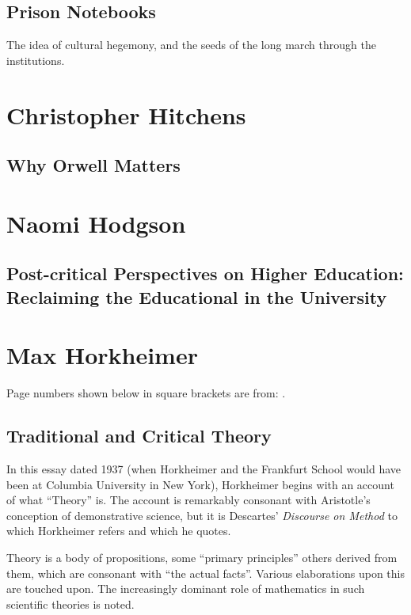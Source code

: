 \documentclass[10pt,titlepage]{book}
\begin{document}
\subsection{Prison Notebooks \cite{gramsci-notes}}

The idea of cultural hegemony, and the seeds of the long march through the institutions.

\section{Christopher Hitchens}\label{HitchensChristopher}

\subsection{Why Orwell Matters\cite{hitchens-wom}}

\section{Naomi Hodgson}\label{HodgsonNaomi}
\subsection{Post-critical Perspectives on Higher Education: Reclaiming the Educational in the University \cite{hodgson2020post}}

\section{Max Horkheimer}\label{HorkheimerMax}

Page numbers shown below in square brackets are from: \cite{horkheimer-crit}.

\subsection{Traditional and Critical Theory}

In this essay \cite{horkheimer-trad, horkheimer-crit} dated 1937 (when Horkheimer and the Frankfurt School would have been at Columbia University in New York), Horkheimer begins with an account of what ``Theory'' is.
The account is remarkably consonant with Aristotle's conception of demonstrative science, but it is Descartes' \emph{Discourse on Method}\cite{descartesDOM} to which Horkheimer refers and which he quotes.

Theory is a body of propositions, some ``primary principles'' others derived from them, which are consonant with ``the actual facts''.
Various elaborations upon this are touched upon.
The increasingly dominant role of mathematics in such scientific theories is noted.
\end{document}
